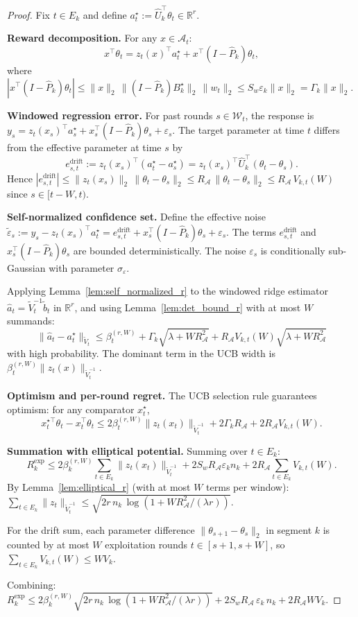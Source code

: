 \documentclass{article}
\newcommand{\R}{\mathbb{R}}
\newcommand{\cA}{\mathcal{A}}
\begin{document}
\begin{proof}
Fix $t \in E_k$ and define $a_t^\star := \widehat U_k^\top \theta_t \in \R^r$.

\textbf{Reward decomposition.}
For any $x \in \cA_t$:
\[
x^\top \theta_t = z_t(x)^\top a_t^\star + x^\top(I - \widehat P_k)\theta_t,
\]
where $|x^\top(I - \widehat P_k)\theta_t| \le \|x\|_2\,\|(I - \widehat P_k)B_k^\star\|_2\,\|w_t\|_2 \le S_w\varepsilon_k\|x\|_2 = \Gamma_k\|x\|_2$.

\textbf{Windowed regression error.}
For past rounds $s \in \mathcal W_t$, the response is $y_s = z_t(x_s)^\top a_s^\star + x_s^\top(I - \widehat P_k)\theta_s + \varepsilon_s$.
The target parameter at time $t$ differs from the effective parameter at time $s$ by
\[
e_{s,t}^{\mathrm{drift}} := z_t(x_s)^\top (a_t^\star - a_s^\star) = z_t(x_s)^\top \widehat U_k^\top (\theta_t - \theta_s).
\]
Hence $|e_{s,t}^{\mathrm{drift}}| \le \|z_t(x_s)\|_2\,\|\theta_t - \theta_s\|_2 \le R_{\cA}\,\|\theta_t - \theta_s\|_2 \le R_{\cA}\,V_{k,t}(W)$
since $s \in [t-W,t)$.

\textbf{Self-normalized confidence set.}
Define the effective noise $\tilde\varepsilon_s := y_s - z_t(x_s)^\top a_t^\star = e_{s,t}^{\mathrm{drift}} + x_s^\top(I - \widehat P_k)\theta_s + \varepsilon_s$.  The terms $e_{s,t}^{\mathrm{drift}}$ and $x_s^\top(I-\widehat P_k)\theta_s$ are bounded deterministically.  The noise $\varepsilon_s$ is conditionally sub-Gaussian with parameter $\sigma_\varepsilon$.

Applying Lemma~\ref{lem:self_normalized_r} to the windowed ridge estimator $\widehat a_t = \widetilde V_t^{-1}\widetilde b_t$ in $\R^r$, and using Lemma~\ref{lem:det_bound_r} with at most $W$ summands:
\[
\|\widehat a_t - a_t^\star\|_{\widetilde V_t} \le \beta_t^{(r,W)} + \Gamma_k\sqrt{\lambda + WR_{\cA}^2} + R_{\cA} V_{k,t}(W)\sqrt{\lambda + WR_{\cA}^2}
\]
with high probability.  The dominant term in the UCB width is $\beta_t^{(r,W)}\|z_t(x)\|_{\widetilde V_t^{-1}}$.

\textbf{Optimism and per-round regret.}
The UCB selection rule guarantees optimism: for any comparator $x_t^\star$,
\[
x_t^{\star\top}\theta_t - x_t^\top\theta_t \le 2\beta_t^{(r,W)}\|z_t(x_t)\|_{\widetilde V_t^{-1}} + 2\Gamma_k R_{\cA} + 2R_{\cA} V_{k,t}(W).
\]

\textbf{Summation with elliptical potential.}
Summing over $t \in E_k$:
\[
R_k^{\mathrm{exp}} \le 2\beta_k^{(r,W)}\sum_{t \in E_k}\|z_t(x_t)\|_{\widetilde V_t^{-1}} + 2S_w R_{\cA} \varepsilon_k n_k + 2R_{\cA}\sum_{t \in E_k} V_{k,t}(W).
\]
By Lemma~\ref{lem:elliptical_r} (with at most $W$ terms per window): $\sum_{t \in E_k}\|z_t\|_{\widetilde V_t^{-1}} \le \sqrt{2r\,n_k\,\log(1 + WR_{\cA}^2/(\lambda r))}$.

For the drift sum, each parameter difference $\|\theta_{s+1} - \theta_s\|_2$ in segment $k$ is counted by at most $W$ exploitation rounds $t \in [s+1, s+W]$, so $\sum_{t \in E_k} V_{k,t}(W) \le W V_k$.

Combining: $R_k^{\mathrm{exp}} \le 2\beta_k^{(r,W)} \sqrt{2r\,n_k\,\log(1 + WR_{\cA}^2/(\lambda r))} + 2S_w R_{\cA}\,\varepsilon_k\,n_k + 2R_{\cA} W V_k$.
\end{proof}
\end{document}
